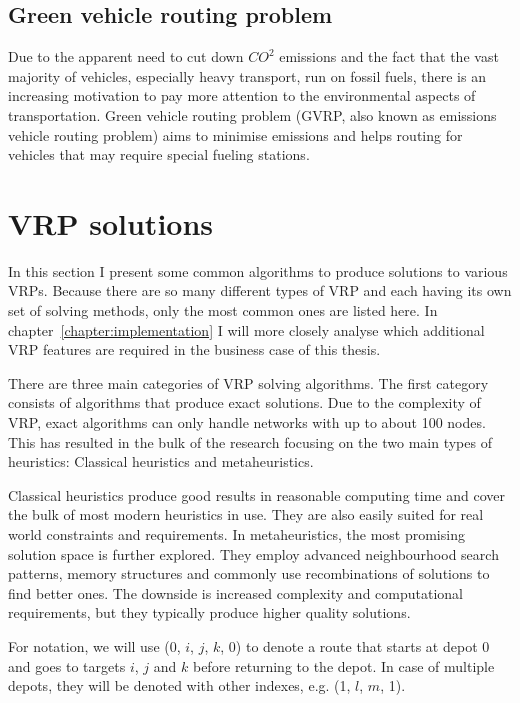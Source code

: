 \subsection{Green vehicle routing problem}

Due to the apparent need to cut down $CO^2$ emissions and the fact that the vast majority of vehicles, especially heavy transport, run on fossil fuels, there is an increasing motivation to pay more attention to the environmental aspects of transportation. Green vehicle routing problem (GVRP, also known as emissions vehicle routing problem) aims to minimise emissions and helps routing for vehicles that may require special fueling stations. \cite{erdougan2012green}



\section{VRP solutions}

In this section I present some common algorithms to produce solutions to various VRPs. Because there are so many different types of VRP and each having its own set of solving methods, only the most common ones are listed here. In chapter~\ref{chapter:implementation} I will more closely analyse which additional VRP features are required in the business case of this thesis. 

There are three main categories of VRP solving algorithms. The first category consists of algorithms that produce exact solutions. Due to the complexity of VRP, exact algorithms can only handle networks with up to about 100 nodes. This has resulted in the bulk of the research focusing on the two main types of heuristics: Classical heuristics and metaheuristics. \cite{laporte2007you}  

Classical heuristics produce good results in reasonable computing time and cover the bulk of most modern heuristics in use. They are also easily suited for real world constraints and requirements. In metaheuristics, the most promising solution space is further explored. They employ advanced neighbourhood search patterns, memory structures and commonly use recombinations of solutions to find better ones. The downside is increased complexity and computational requirements, but they typically produce higher quality solutions. \cite{laporte2000classical}

For notation, we will use (0, $i$, $j$, $k$, 0) to denote a route that starts at depot 0 and goes to targets $i$, $j$ and $k$ before returning to the depot. In case of multiple depots, they will be denoted with other indexes, e.g. (1, $l$, $m$, 1).



